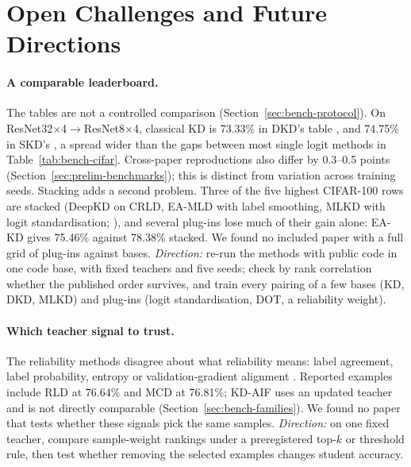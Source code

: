 \section{Open Challenges and Future Directions}
\label{sec:future}

\paragraph{A comparable leaderboard.}
The tables are not a controlled comparison (Section~\ref{sec:bench-protocol}). On ResNet32$\times$4$\to$ResNet8$\times$4,
classical KD is 73.33\% in DKD's table \citep{zhao2022dkd}, and 74.75\% in SKD's \citep{jeong2026skd}, a spread wider than the gaps between most single logit methods in
Table~\ref{tab:bench-cifar}. Cross-paper reproductions also differ by 0.3--0.5 points (Section~\ref{sec:prelim-benchmarks}); this is distinct from variation across training seeds. Stacking adds a second problem. Three of the five highest CIFAR-100 rows are stacked
(DeepKD on CRLD, EA-MLD with label smoothing, MLKD with logit standardisation;
\citealp{huang2025deepkd,su2025eakd,sun2024lskd}), and several plug-ins lose much of their gain alone: EA-KD gives
75.46\% against 78.38\% stacked. We found no
included paper with a full grid of plug-ins against bases. \emph{Direction:} re-run the methods
with public code in one code base, with fixed teachers and five seeds; check by rank correlation whether
the published order survives, and train every pairing of a few bases (KD, DKD, MLKD) and plug-ins (logit standardisation, DOT, a reliability
weight).

\paragraph{Which teacher signal to trust.}
The reliability methods disagree about what reliability means: label agreement, label probability, entropy or validation-gradient alignment
\citep{meng2019conditionalts,mishra2021cckd,su2025eakd,sumit2026chad}. Reported examples include RLD at 76.64\% and MCD at 76.81\%; KD-AIF uses an updated teacher and is not directly comparable (Section~\ref{sec:bench-families}). We found no paper that tests whether
these signals pick the same samples. \emph{Direction:} on one fixed teacher, compare sample-weight rankings under a preregistered top-$k$ or threshold rule, then test whether removing the selected examples changes student accuracy.


